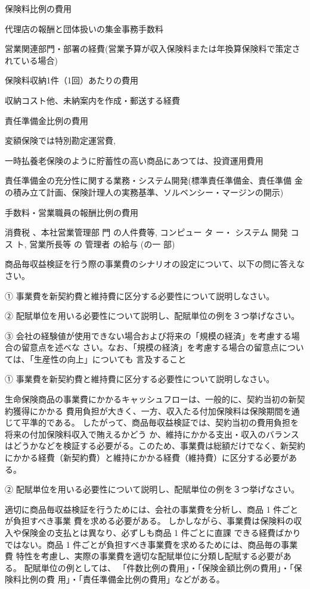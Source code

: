 \documentclass[report,gutter=10mm,fore-edge=10mm,uplatex,dvipdfmx]{jlreq}
\begin{document}
保険料比例の費用

代理店の報酬と団体扱いの集金事務手数料

営業関連部門・部署の経費(営業予算が収入保険料または年換算保険料で策定されている場合)


保険料収納1件（1回）あたりの費用

収納コスト他、未納案内を作成・郵送する経費


責任準備金比例の費用

変額保険では特別勘定運営費,

一時払養老保険のように貯蓄性の高い商品にあつては、投資運用費用

責任準備金の充分性に関する業務・システム開発(標準責任準備金、責任準備
金の積み立て計画、保険計理人の実務基準、ソルベンシー・マージンの開示)


手数料・営業職員の報酬比例の費用

消費税 、本社営業管理部 門 の人件費等, コンピュー タ ー・ システム 開発 コス ト, 
営業所長等 の 管理者 の給与 (の一 部)


商品毎収益検証を行う際の事業費のシナリオの設定について、以下の問に答えなさい。

① 事業費を新契約費と維持費に区分する必要性について説明しなさい。

② 配賦単位を用いる必要性について説明し、配賦単位の例を３つ挙げなさい。

③ 会社の経験値が使用できない場合および将来の「規模の経済」を考慮する場合の留意点を述べな
さい。なお、「規模の経済」を考慮する場合の留意点については、「生産性の向上」についても
言及すること

\answer{}
① 事業費を新契約費と維持費に区分する必要性について説明しなさい。

生命保険商品の事業費にかかるキャッシュフローは、一般的に、契約当初の新契約獲得にかかる
費用負担が大きく、一方、収入たる付加保険料は保険期間を通じて平準的である。
したがって、商品毎収益検証では、契約当初の費用負担を将来の付加保険料収入で賄えるかどう
か、維持にかかる支出・収入のバランスはどうかなどを検証する必要がる。このため、事業費は総額だけでなく、新契約にかかる経費（新契約費）と維持にかかる経費（維持費）に区分する必要がある。

② 配賦単位を用いる必要性について説明し、配賦単位の例を３つ挙げなさい。

適切に商品毎収益検証を行うためには、会社の事業費を分析し、商品 1 件ごとが負担すべき事業
費を求める必要がある。
しかしながら、事業費は保険料の収入や保険金の支払とは異なり、必ずしも商品 1 件ごとに直課
できる経費ばかりではない。商品 1 件ごとが負担すべき事業費を求めるためには、商品毎の事業費
特性を考慮し、実際の事業費を適切な配賦単位に分類し配賦する必要がある。
配賦単位の例としては、
「件数比例の費用」・「保険金額比例の費用」・「保険料比例の費
用」・「責任準備金比例の費用」などがある。
\end{document}
